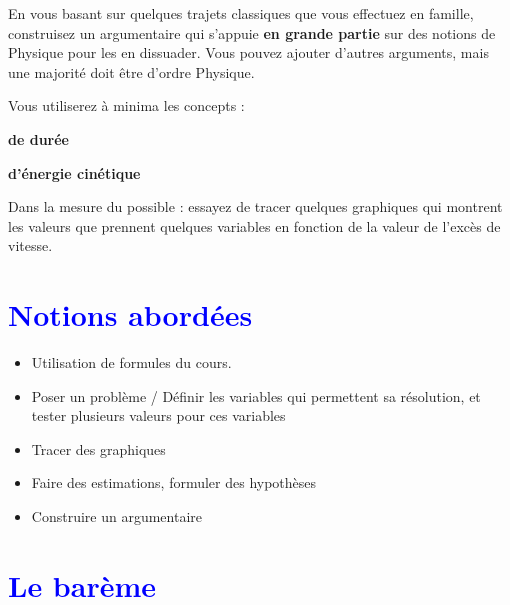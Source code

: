 \documentclass[a4paper,12pt]{article}
\begin{document}
\vspace{1em}

En vous basant sur quelques trajets classiques que vous effectuez en famille, construisez un argumentaire qui s'appuie \textbf{en grande partie} sur des notions de Physique pour les en dissuader.
Vous pouvez ajouter d'autres arguments, mais une majorité doit être d'ordre Physique. \par 

\vspace{1em}

Vous utiliserez à minima les concepts :
\begin{compactenum}
  \item \textbf{de durée}
  \item \textbf{d'énergie cinétique}
\end{compactenum}

\vspace{1em}

Dans la mesure du possible : essayez de tracer quelques graphiques qui montrent les valeurs que prennent quelques variables en fonction de la valeur de l'excès de vitesse.

\section*{\textcolor{blue}{Notions abordées}}

\begin{itemize}[noitemsep]
  \item Utilisation de formules du cours.
  \item Poser un problème / Définir les variables qui permettent sa résolution, et tester plusieurs valeurs pour ces variables
  \item Tracer des graphiques 
  \item Faire des estimations, formuler des hypothèses
  \item Construire un argumentaire
\end{itemize}

\section*{\textcolor{blue}{Le barème}}
\end{document}
